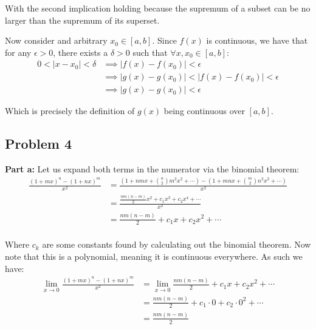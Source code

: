 \documentclass{article}
\begin{document}
With the second implication holding because the supremum of a subset can be no larger than the supremum of its superset.

Now consider and arbitrary $x_0\in[a,b]$. Since $f(x)$ is continuous, we have that for any $\epsilon>0$, there exists a $\delta>0$ such that $\forall x,x_0\in[a,b]$:
\begin{align*}
  0<|x-x_0|<\delta&\implies |f(x)-f(x_0)|<\epsilon\\
  &\implies|g(x)-g(x_0)|<|f(x)-f(x_0)|<\epsilon\\
  &\implies|g(x)-g(x_0)|<\epsilon
\end{align*}

Which is precisely the definition of $g(x)$ being continuous over $[a,b]$.



\bigskip

\subsection*{Problem 4}
\noindent\textbf{Part a:} Let us expand both terms in the numerator via the binomial theorem:
\begin{align*}
  \frac{(1+mx)^n-(1+nx)^m}{x^2}&=\frac{\left(1+nmx+\binom{n}{2}m^2x^2+\cdots\right)-\left(1+mnx+\binom{m}{2}n^2x^2+\cdots\right)}{x^2}\\
  &=\frac{\frac{nm(n-m)}{2}x^2+c_1x^3+c_2x^4+\cdots}{x^2}\\
  &=\frac{nm(n-m)}{2}+c_1x+c_2x^2+\cdots\\
\end{align*}

Where $c_k$ are some constants found by calculating out the binomial theorem. Now note that this is a polynomial, meaning it is continuous everywhere. As such we have:
\begin{align*}
  \lim_{x\to0}\frac{(1+mx)^n-(1+nx)^m}{x^2}&=\lim_{x\to0}\frac{nm(n-m)}{2}+c_1x+c_2x^2+\cdots\tag{see above}\\
  &=\frac{nm(n-m)}{2}+c_1\cdot0+c_2\cdot0^2+\cdots\tag{continous}\\
  &=\frac{nm(n-m)}{2}
\end{align*}
\bigskip
\end{document}
